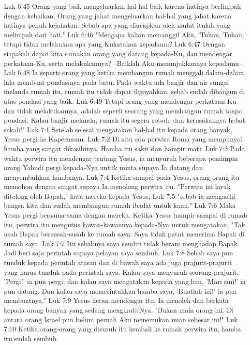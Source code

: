 Luk 6:45  Orang yang baik mengeluarkan hal-hal baik karena hatinya berlimpah dengan kebaikan. Orang yang jahat mengeluarkan hal-hal yang jahat karena hatinya penuh kejahatan. Sebab apa yang diucapkan oleh mulut itulah yang melimpah dari hati."
Luk 6:46  "Mengapa kalian memanggil Aku, 'Tuhan, Tuhan,' tetapi tidak melakukan apa yang Kukatakan kepadamu?
Luk 6:47  Dengan siapakah dapat kita samakan orang yang datang kepada-Ku, dan mendengar perkataan-Ku, serta melakukannya? --Baiklah Aku menunjukkannya kepadamu--.
Luk 6:48  Ia seperti orang yang ketika membangun rumah menggali dalam-dalam, lalu membuat pondasinya pada batu. Pada waktu ada banjir dan air sungai melanda rumah itu, rumah itu tidak dapat digoyahkan, sebab sudah dibangun di atas pondasi yang baik.
Luk 6:49  Tetapi orang yang mendengar perkataan-Ku dan tidak melakukannya, adalah seperti seorang yang membangun rumah tanpa pondasi. Kalau banjir melanda, rumah itu segera roboh; dan kerusakannya hebat sekali!"
Luk 7:1  Setelah selesai mengatakan hal-hal itu kepada orang banyak, Yesus pergi ke Kapernaum.
Luk 7:2  Di situ ada perwira Roma yang mempunyai hamba yang sangat dikasihinya. Hamba itu sakit dan hampir mati.
Luk 7:3  Pada waktu perwira itu mendengar tentang Yesus, ia menyuruh beberapa pemimpin orang Yahudi pergi kepada-Nya untuk minta supaya Ia datang dan menyembuhkan hambanya.
Luk 7:4  Ketika sampai pada Yesus, orang-orang itu memohon dengan sangat supaya Ia menolong perwira itu. "Perwira ini layak ditolong oleh Bapak," kata mereka kepada Yesus,
Luk 7:5  "sebab ia mengasihi bangsa kita dan sudah membangun rumah ibadat untuk kami."
Luk 7:6  Maka Yesus pergi bersama-sama dengan mereka. Ketika Yesus hampir sampai di rumah itu, perwira itu mengutus kawan-kawannya kepada-Nya untuk mengatakan, "Tak usah Bapak bersusah-susah ke rumah saya. Saya tidak patut menerima Bapak di rumah saya.
Luk 7:7  Itu sebabnya saya sendiri tidak berani menghadap Bapak. Jadi beri saja perintah supaya pelayan saya sembuh.
Luk 7:8  Sebab saya pun tunduk kepada perintah atasan dan di bawah saya ada juga prajurit-prajurit yang harus tunduk pada perintah saya. Kalau saya menyuruh seorang prajurit, 'Pergi!' ia pun pergi; dan kalau saya mengatakan kepada yang lain, 'Mari sini!' ia pun datang. Dan kalau saya memerintahkan hamba saya, 'Buatlah ini!' ia pun membuatnya."
Luk 7:9  Yesus heran mendengar itu. Ia menoleh dan berkata kepada orang banyak yang sedang mengikuti-Nya, "Bukan main orang ini. Di antara orang Israel pun belum pernah Aku menemukan iman sebesar ini!"
Luk 7:10  Ketika orang-orang yang disuruh itu kembali ke rumah perwira itu, hamba itu sudah sembuh.

